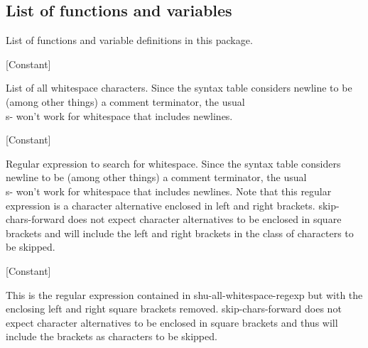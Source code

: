 \subsection{List of functions and variables}

List of functions and variable definitions in this package.



\vspace{1em}
\noindent
{}
\usebox{\funcname}
 \hfill [Constant]

\begin{doc-string}
List of all whitespace characters.
Since the syntax table considers newline to be (among other things) a
comment terminator, the usual \\s- won't work for whitespace that includes
newlines.
\end{doc-string}

\vspace{1em}
\noindent
{}
\usebox{\funcname}
 \hfill [Constant]

\begin{doc-string}
Regular expression to search for whitespace.  Since the syntax table considers
newline to be (among other things) a comment terminator, the usual \\s- won't work
for whitespace that includes newlines.  Note that this regular expression is a
character alternative enclosed in left and right brackets.  skip-chars-forward does
not expect character alternatives to be enclosed in square brackets and will include
the left and right brackets in the class of characters to be skipped.
\end{doc-string}

\vspace{1em}
\noindent
{}
\usebox{\funcname}
 \hfill [Constant]

\begin{doc-string}
This is the regular expression contained in shu-all-whitespace-regexp but with
the enclosing left and right square brackets removed.  skip-chars-forward does
not expect character alternatives to be enclosed in square brackets and thus
will include the brackets as characters to be skipped.
\end{doc-string}


